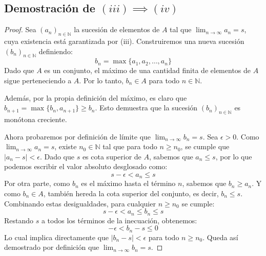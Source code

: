 \documentclass[11pt, a4paper]{article}
\newcommand{\N}{\mathbb{N}}
\begin{document}
	\subsection*{Demostración de $(iii) \implies (iv)$}
	\begin{proof}
		Sea $(a_n)_{n \in \N}$ la sucesión de elementos de $A$ tal que $\lim_{n \to \infty} a_n = s$, cuya existencia está garantizada por (iii). Construiremos una nueva sucesión $(b_n)_{n \in \N}$ definiendo:
		\[
		b_n = \max\{a_1, a_2, \dots, a_n\}
		\]
		Dado que $A$ es un conjunto, el máximo de una cantidad finita de elementos de $A$ sigue perteneciendo a $A$. Por lo tanto, $b_n \in A$ para todo $n \in \N$.
		
		Además, por la propia definición del máximo, es claro que $b_{n+1} = \max\{b_n, a_{n+1}\} \geq b_n$. Esto demuestra que la sucesión $(b_n)_{n \in \N}$ es monótona creciente.
		
		Ahora probaremos por definición de límite que $\lim_{n \to \infty} b_n = s$. 
		Sea $\epsilon > 0$. Como $\lim_{n \to \infty} a_n = s$, existe $n_0 \in \N$ tal que para todo $n \geq n_0$, se cumple que $|a_n - s| < \epsilon$. 
		Dado que $s$ es cota superior de $A$, sabemos que $a_n \leq s$, por lo que podemos escribir el valor absoluto desglosado como:
		\[
		s - \epsilon < a_n \leq s
		\]
		Por otra parte, como $b_n$ es el máximo hasta el término $n$, sabemos que $b_n \geq a_n$. Y como $b_n \in A$, también hereda la cota superior del conjunto, es decir, $b_n \leq s$. 
		Combinando estas desigualdades, para cualquier $n \geq n_0$ se cumple:
		\[
		s - \epsilon < a_n \leq b_n \leq s
		\]
		Restando $s$ a todos los términos de la inecuación, obtenemos:
		\[
		-\epsilon < b_n - s \leq 0
		\]
		Lo cual implica directamente que $|b_n - s| < \epsilon$ para todo $n \geq n_0$. Queda así demostrado por definición que $\lim_{n \to \infty} b_n = s$.
	\end{proof}
	
	\vspace{0.5cm}
	
\end{document}

